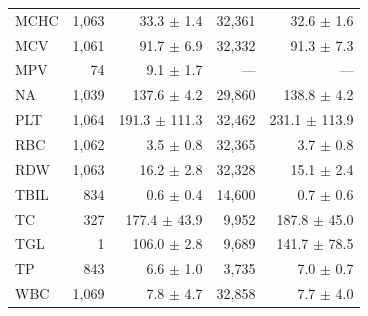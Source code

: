 \begin{table}[ht]
\begin{tabular}{lrrrr}
MCHC & 1,063 & 33.3 $\pm$ 1.4 & 32,361 & 32.6 $\pm$ 1.6 \\
MCV & 1,061 & 91.7 $\pm$ 6.9 & 32,332 & 91.3 $\pm$ 7.3 \\
MPV & 74 & 9.1 $\pm$ 1.7 & --- & --- \\
NA & 1,039 & 137.6 $\pm$ 4.2 & 29,860 & 138.8 $\pm$ 4.2 \\
PLT & 1,064 & 191.3 $\pm$ 111.3 & 32,462 & 231.1 $\pm$ 113.9 \\
RBC & 1,062 & 3.5 $\pm$ 0.8 & 32,365 & 3.7 $\pm$ 0.8 \\
RDW & 1,063 & 16.2 $\pm$ 2.8 & 32,328 & 15.1 $\pm$ 2.4 \\
TBIL & 834 & 0.6 $\pm$ 0.4 & 14,600 & 0.7 $\pm$ 0.6 \\
TC & 327 & 177.4 $\pm$ 43.9 & 9,952 & 187.8 $\pm$ 45.0 \\
TGL & 1 & 106.0 $\pm$ 2.8 & 9,689 & 141.7 $\pm$ 78.5 \\
TP & 843 & 6.6 $\pm$ 1.0 & 3,735 & 7.0 $\pm$ 0.7 \\
WBC & 1,069 & 7.8 $\pm$ 4.7 & 32,858 & 7.7 $\pm$ 4.0 \\
\bottomrule
\end{tabular}
\label{tab:03_cohort_test}
\end{table}